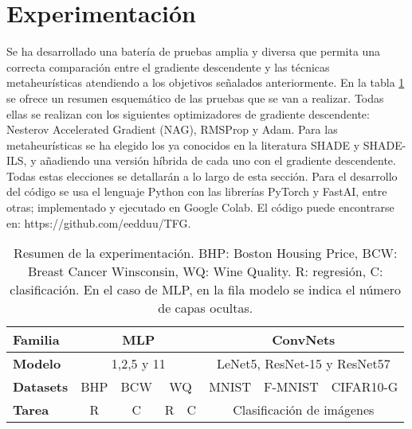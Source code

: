 \section{Experimentación}

Se ha desarrollado una batería de pruebas amplia y diversa que permita una correcta comparación entre el gradiente descendente y las técnicas metaheurísticas atendiendo a los objetivos señalados anteriormente. En la tabla \ref{table:exp} se ofrece un resumen esquemático de las pruebas que se van a realizar. Todas ellas se realizan con los siguientes optimizadores de gradiente descendente: Nesterov Accelerated Gradient (NAG), RMSProp y Adam. Para las metaheurísticas se ha elegido los ya conocidos en la literatura SHADE y SHADE-ILS, y añadiendo una versión híbrida de cada uno con el gradiente descendente. Todas estas elecciones se detallarán a lo largo de esta sección. Para el desarrollo del código se usa el lenguaje Python con las librerías PyTorch y FastAI, entre otras; implementado y ejecutado en Google Colab. El código puede encontrarse en: https://github.com/eedduu/TFG.




\begin{table}[]
\begin{tabular}{|l|cccc|cll|}
\hline
\textbf{Familia} & \multicolumn{4}{c|}{MLP}                                                                                                                               & \multicolumn{3}{c|}{ConvNets}                                         \\ \hline
\textbf{Modelo}  & \multicolumn{4}{c|}{1,2,5 y 11}                                                                                                                        & \multicolumn{3}{c|}{LeNet5, ResNet-15 y ResNet57}                               \\ \hline
\textbf{Datasets}           & \multicolumn{1}{c|}{BHP} & \multicolumn{1}{c|}{BCW} & \multicolumn{2}{c|}{WQ}              & \multicolumn{1}{c|}{MNIST} & \multicolumn{1}{l|}{F-MNIST} & CIFAR10-G \\ \hline
\textbf{Tarea}             & \multicolumn{1}{c|}{R}                        & \multicolumn{1}{c|}{C}            & \multicolumn{1}{c|}{R} & C & \multicolumn{3}{c|}{Clasificación de imágenes}                        \\ \hline
\end{tabular}
\caption{Resumen de la experimentación. BHP: Boston Housing Price, BCW: Breast Cancer Winsconsin, WQ: Wine Quality. R: regresión, C: clasificación. En el caso de MLP, en la fila modelo se indica el número de capas ocultas.}
\label{table:exp}
\end{table}

